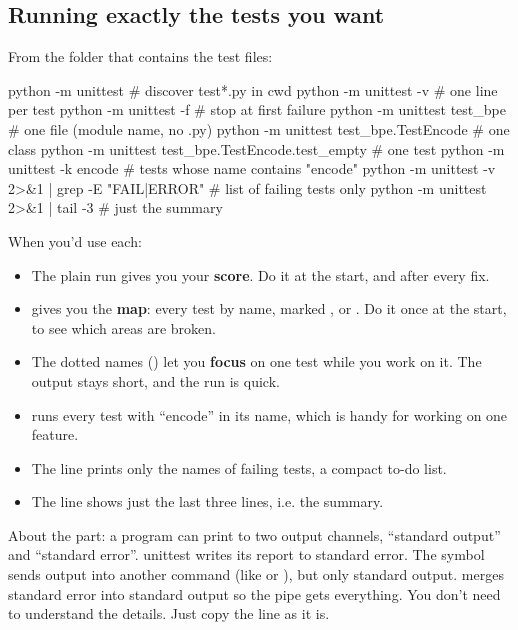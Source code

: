 \documentclass[10pt,a4paper]{article}
\begin{document}
\subsection{Running exactly the tests you want}
From the folder that contains the test files:
\begin{shcode}
python -m unittest                                  # discover test*.py in cwd
python -m unittest -v                               # one line per test
python -m unittest -f                               # stop at first failure
python -m unittest test_bpe                         # one file (module name, no .py)
python -m unittest test_bpe.TestEncode              # one class
python -m unittest test_bpe.TestEncode.test_empty   # one test
python -m unittest -k encode                        # tests whose name contains "encode"
python -m unittest -v 2>&1 | grep -E "FAIL|ERROR"   # list of failing tests only
python -m unittest 2>&1 | tail -3                   # just the summary
\end{shcode}
When you’d use each:
\begin{itemize}
\item The plain run gives you your \textbf{score}. Do it at the start, and after every fix.
\item {} gives you the \textbf{map}: every test by name, marked ,  or . Do it once at the start, to see which areas are broken.
\item The dotted names () let you \textbf{focus} on one test while you work on it. The output stays short, and the run is quick.
\item {} runs every test with “encode” in its name, which is handy for working on one feature.
\item The  line prints only the names of failing tests, a compact to-do list.
\item The  line shows just the last three lines, i.e. the summary.
\end{itemize}
About the  part: a program can print to two output channels, “standard output” and “standard error”. unittest writes its report to standard error. The \code{\textbar{}\allowbreak{}} symbol sends output into another command (like  or ), but only standard output.  merges standard error into standard output so the pipe gets everything. You don’t need to understand the details. Just copy the line as it is.
\end{document}
